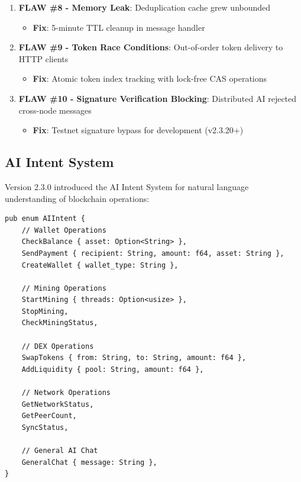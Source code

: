 \documentclass[11pt,a4paper]{article}
\begin{document}
\begin{enumerate}[leftmargin=*]
    \item \textbf{FLAW \#8 - Memory Leak}: Deduplication cache grew unbounded
        \begin{itemize}
            \item \textbf{Fix}: 5-minute TTL cleanup in message handler
        \end{itemize}

    \item \textbf{FLAW \#9 - Token Race Conditions}: Out-of-order token delivery to HTTP clients
        \begin{itemize}
            \item \textbf{Fix}: Atomic token index tracking with lock-free CAS operations
        \end{itemize}

    \item \textbf{FLAW \#10 - Signature Verification Blocking}: Distributed AI rejected cross-node messages
        \begin{itemize}
            \item \textbf{Fix}: Testnet signature bypass for development (v2.3.20+)
        \end{itemize}
\end{enumerate}

\subsection{AI Intent System}

Version 2.3.0 introduced the AI Intent System for natural language understanding of blockchain operations:

\begin{lstlisting}[caption={AI Intent Types}, label=lst:intent-types]
pub enum AIIntent {
    // Wallet Operations
    CheckBalance { asset: Option<String> },
    SendPayment { recipient: String, amount: f64, asset: String },
    CreateWallet { wallet_type: String },

    // Mining Operations
    StartMining { threads: Option<usize> },
    StopMining,
    CheckMiningStatus,

    // DEX Operations
    SwapTokens { from: String, to: String, amount: f64 },
    AddLiquidity { pool: String, amount: f64 },

    // Network Operations
    GetNetworkStatus,
    GetPeerCount,
    SyncStatus,

    // General AI Chat
    GeneralChat { message: String },
}
\end{lstlisting}
\end{document}

